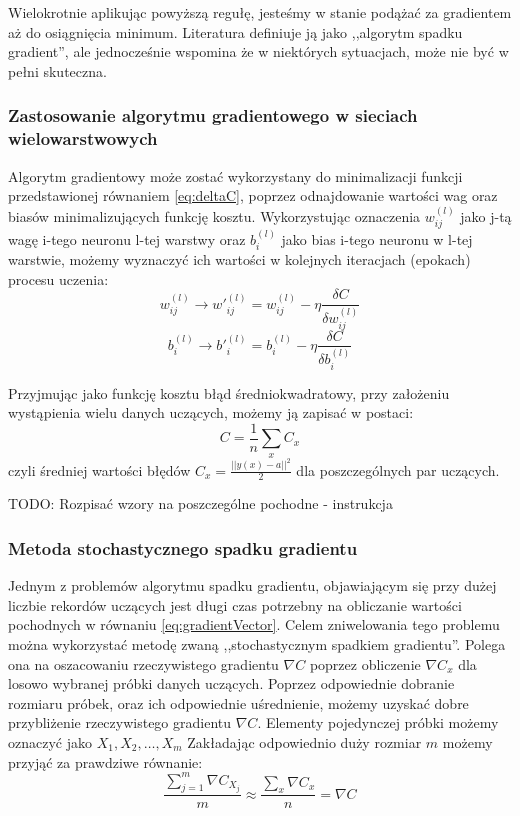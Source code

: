 \documentclass[12pt,twoside]{article}
\begin{document}
Wielokrotnie aplikując powyższą regułę, jesteśmy w stanie podążać za gradientem aż do osiągnięcia minimum.
Literatura \cite{nndl} definiuje ją jako ,,algorytm spadku gradient'', ale jednocześnie wspomina że w niektórych sytuacjach, może nie być w pełni skuteczna.

\subsubsection{Zastosowanie algorytmu gradientowego w sieciach wielowarstwowych}

Algorytm gradientowy może zostać wykorzystany do minimalizacji funkcji przedstawionej równaniem \ref{eq:deltaC}, poprzez odnajdowanie wartości wag oraz biasów minimalizujących funkcję kosztu.
Wykorzystując oznaczenia $w^{(l)}_{ij}$ jako j-tą wagę i-tego neuronu l-tej warstwy oraz $b^{(l)}_i$ jako bias i-tego neuronu w l-tej warstwie, możemy wyznaczyć ich wartości w kolejnych iteracjach (epokach) procesu uczenia:
\begin{equation}
	\label{eq:weightUpdate}
	w^{(l)}_{ij} \rightarrow {w'}^{(l)}_{ij} = w^{(l)}_{ij} - \eta \frac{\delta C}{\delta w^{(l)}_{ij}}
\end{equation}
\begin{equation}
	\label{eq:biasUpdate}
	b^{(l)}_{i} \rightarrow {b'}^{(l)}_{i} = b^{(l)}_{i} - \eta \frac{\delta C}{\delta b^{(l)}_{i}}
\end{equation}

Przyjmując jako funkcję kosztu błąd średniokwadratowy, przy założeniu wystąpienia wielu danych uczących, możemy ją zapisać w postaci:
\begin{equation}
	C = \frac{1}{n} \sum \limits_x C_x
\end{equation}
czyli średniej wartości błędów $C_{x} = \frac{||y(x) - a||^2}{2}$ dla poszczególnych par uczących.

TODO: Rozpisać wzory na poszczególne pochodne - instrukcja \cite{kiaMultiLayer}



\subsubsection{Metoda stochastycznego spadku gradientu}
Jednym z problemów algorytmu spadku gradientu, objawiającym się przy dużej liczbie rekordów uczących \cite{nndl} jest długi czas potrzebny na obliczanie wartości pochodnych w równaniu \ref{eq:gradientVector}.
Celem zniwelowania tego problemu można wykorzystać metodę zwaną ,,stochastycznym spadkiem gradientu''.
Polega ona na oszacowaniu rzeczywistego gradientu $\nabla C$ poprzez obliczenie $\nabla C_x$ dla losowo wybranej próbki danych uczących.
Poprzez odpowiednie dobranie rozmiaru próbek, oraz ich odpowiednie uśrednienie, możemy uzyskać dobre przybliżenie rzeczywistego gradientu $\nabla C$.\cite{nndl}
Elementy pojedynczej próbki możemy oznaczyć jako $X_1, X_2, \ldots , X_m$
Zakładając odpowiednio duży rozmiar $m$ możemy przyjąć za prawdziwe równanie:
\begin{equation}
	\label{eq:stochasticGradient}
	\frac{ \sum_{j=1}^{m} \nabla C_{X_j}}{m} \approx \frac{ \sum_x \nabla C_x}{n} = \nabla C
\end{equation}
\end{document}
